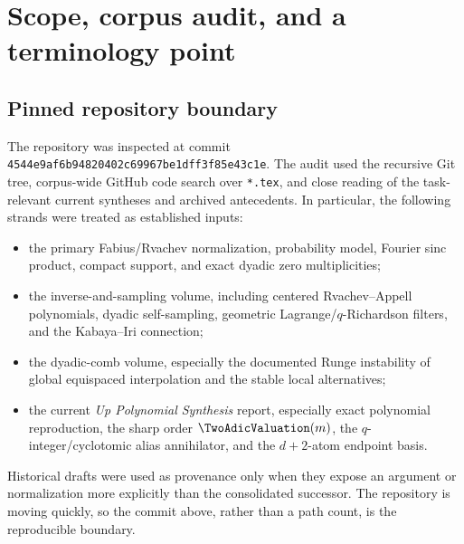 \documentclass[11pt,oneside]{article}
\numberwithin{equation}{section}
\theoremstyle{definition}
\theoremstyle{remark}
\begin{document}
\begin{abstract}
For nested node sets a further algebraic structure appears.  The closed-loop
projectors commute and satisfy
\(\mathcal I_m\mathcal I_n=\mathcal I_{\min(m,n)}\).  Their differences are
pairwise-annihilating idempotent detail projectors.  Consequently every convergent
nested Lagrange hierarchy for \(u\) becomes a genuine self-expansion of \(u\) into
finite blocks of shifted copies of \(u\).  Dyadically nested Chebyshev--Lobatto
nodes give a rigorous superalgebraically convergent example.  The report develops
this factorization, its compressed \(d+2\)-atom counterpart, its relations to the
Rvachev--Appell/Kabaya--Iri polynomials and the dyadic alias nullspace, numerical
checks, corpus-relative new deductions, conjectures, and a Lean formalization
roadmap.
\end{abstract}

\tableofcontents
\clearpage

\section{Scope, corpus audit, and a terminology point}
\label{sec:scope}

\subsection{Pinned repository boundary}
The repository was inspected at commit
\texttt{4544e9af6b94820402c69967be1dff3f85e43c1e}.  The audit used the recursive
Git tree, corpus-wide GitHub code search over \texttt{*.tex}, and close reading of
the task-relevant current syntheses and archived antecedents.  In particular, the
following strands were treated as established inputs:
\begin{itemize}
\item the primary Fabius/Rvachev normalization, probability model, Fourier sinc
      product, compact support, and exact dyadic zero multiplicities;
\item the inverse-and-sampling volume, including centered Rvachev--Appell
      polynomials, dyadic self-sampling, geometric Lagrange/\(q\)-Richardson
      filters, and the Kabaya--Iri connection;
\item the dyadic-comb volume, especially the documented Runge instability of
      global equispaced interpolation and the stable local alternatives;
\item the current \emph{Up Polynomial Synthesis} report, especially exact
      polynomial reproduction, the sharp order \(\TwoAdicValuation(m)\), the
      \(q\)-integer/cyclotomic alias annihilator, and the \(d+2\)-atom endpoint
      basis.
\end{itemize}
Historical drafts were used as provenance only when they expose an argument or
normalization more explicitly than the consolidated successor.  The repository is
moving quickly, so the commit above, rather than a path count, is the reproducible
boundary.
\end{document}
